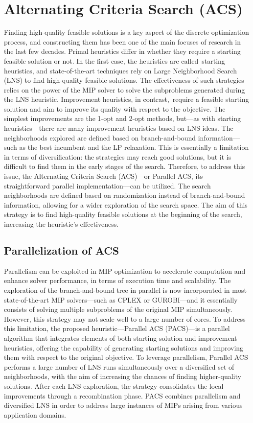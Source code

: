 \section{Alternating Criteria Search (ACS)}
Finding high-quality feasible solutions is a key aspect of the discrete optimization process, and constructing them has been one of the main focuses of research in the last few decades.  
Primal heuristics differ in whether they require a starting feasible solution or not. In the first case, the heuristics are called starting heuristics, and state-of-the-art techniques rely on Large Neighborhood Search (LNS) to find high-quality feasible solutions. The effectiveness of such strategies relies on the power of the MIP solver to solve the subproblems generated during the LNS heuristic.  
Improvement heuristics, in contrast, require a feasible starting solution and aim to improve its quality with respect to the objective. The simplest improvements are the 1-opt and 2-opt methods, but—as with starting heuristics—there are many improvement heuristics based on LNS ideas. The neighborhoods explored are defined based on branch-and-bound information—such as the best incumbent and the LP relaxation.  
This is essentially a limitation in terms of diversification: the strategies may reach good solutions, but it is difficult to find them in the early stages of the search.  
Therefore, to address this issue, the Alternating Criteria Search (ACS)—or Parallel ACS, its straightforward parallel implementation—can be utilized. The search neighborhoods are defined based on randomization instead of branch-and-bound information, allowing for a wider exploration of the search space. The aim of this strategy is to find high-quality feasible solutions at the beginning of the search, increasing the heuristic's effectiveness.

\subsection{Parallelization of ACS}
Parallelism can be exploited in MIP optimization to accelerate computation and enhance solver performance, in terms of execution time and scalability.
The exploration of the branch-and-bound tree in parallel is now incorporated in most state-of-the-art MIP solvers—such as CPLEX or GUROBI—and it essentially consists of solving multiple subproblems of the original MIP simultaneously.  
However, this strategy may not scale well to a large number of cores.  
To address this limitation, the proposed heuristic—Parallel ACS (PACS)—is a parallel algorithm that integrates elements of both starting solution and improvement heuristics, offering the capability of generating starting solutions and improving them with respect to the original objective.  
To leverage parallelism, Parallel ACS performs a large number of LNS runs simultaneously over a diversified set of neighborhoods, with the aim of increasing the chances of finding higher-quality solutions. After each LNS exploration, the strategy consolidates the local improvements through a recombination phase.  
PACS combines parallelism and diversified LNS in order to address large instances of MIPs arising from various application domains.

